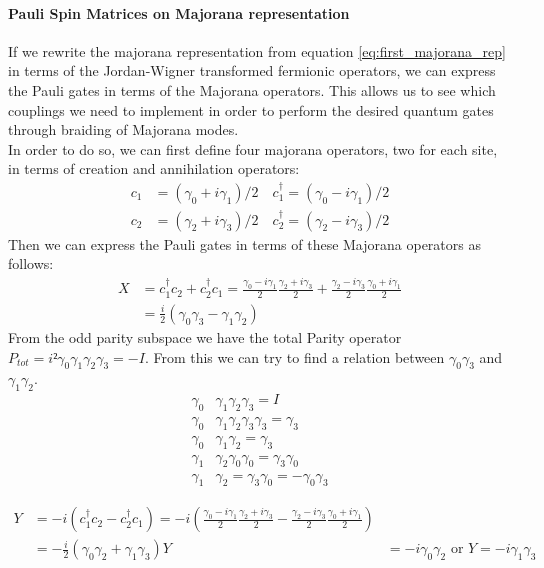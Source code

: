 \paragraph{Pauli Spin Matrices on Majorana representation}
If we rewrite the majorana representation from equation \ref{eq:first_majorana_rep} in terms of the Jordan-Wigner transformed fermionic operators, we can express the Pauli gates in terms of the Majorana operators. This allows us to see which couplings we need to implement in order to perform the desired quantum gates through braiding of Majorana modes.\\
In order to do so, we can first define four majorana operators, two for each site, in terms of creation and annihilation operators:
\begin{align*}
  c_1 &= (γ_0 + i γ_1)/2 \quad c_1 ^{†} = (γ_0 - i γ_1)/2 \\
  c_2 &= (γ_2 + i γ_3)/2 \quad c_2 ^{†} = (γ_2 - i γ_3)/2
\end{align*}
Then we can express the Pauli gates in terms of these Majorana operators as follows:
\begin{align*}
  X &= c_1^{†} c_2 + c_2^{†} c_1 =  \frac{γ_0 - iγ_1}{2}\frac{γ_2 + iγ_3}{2} + \frac{γ_2 - iγ_3}{2}\frac{γ_0 + iγ_1}{2} \\
    &= \frac{i}{2} (γ_0γ_3 - γ_1γ_2)
\end{align*}
From the odd parity subspace we have the total Parity operator $P_{tot}=i²γ_0γ_1γ_2γ_3=-I$. From this we can try to find a relation between $γ_0γ_3$ and $γ_1γ_2$.
\begin{align*}
  γ_0&γ_1γ_2γ_3 = I\\
  γ_0&γ_1γ_2γ_3 γ_3 = γ_3\\
  γ_0&γ_1γ_2 = γ_3 \\
  γ_1&γ_2γ_0γ_0 = γ_3γ_0\\
  γ_1&γ_2=γ_3γ_0=-γ_0γ_3
\end{align*}

\begin{align*}
  Y &= -i(c_1^{†} c_2 - c_2^{†} c_1) = -i\left(\frac{γ_0 - iγ_1}{2}\frac{γ_2 + iγ_3}{2} - \frac{γ_2 - iγ_3}{2}\frac{γ_0 + iγ_1}{2}\right) \\
    &= -\frac{i}{2} (γ_0γ_2 + γ_1γ_3)
  Y &= -i γ_0γ_2 \text{ or } Y = -i γ_1γ_3
\end{align*}

